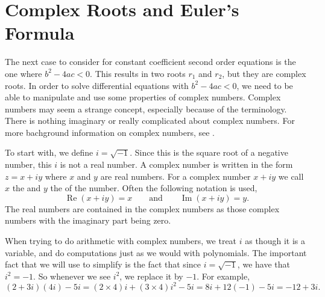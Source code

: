 \section{Complex Roots and Euler's Formula}
\label{complexroots:section}




The next case to consider for constant coefficient second order equations is the one where $b^2 - 4ac < 0$. This results in two roots $r_1$ and $r_2$, but they are complex roots. In order to solve differential equations with $b^2 - 4ac < 0$, we need to be able to manipulate and use some properties of complex numbers. Complex numbers may seem a strange concept, especially because of the
terminology.  There is nothing imaginary or really complicated about complex
numbers. For more bachground information on complex numbers, see .

To start with, we define $i = \sqrt{-1}$. Since this is the square root of a negative number, this $i$ is not a real number. A complex number is written in the form $z = x+iy$ where $x$ and $y$ are real numbers. For a complex number $x+iy$ we call
$x$ the \emph{} and $y$ the \emph{} of the number.
Often the following notation is used,
\begin{equation*}
\operatorname{Re}(x+iy) = x
\qquad \text{and} \qquad
\operatorname{Im}(x+iy) = y.
\end{equation*}
The real numbers are contained in the complex numbers as those complex numbers with the imaginary part being zero. 

When trying to do arithmetic with complex numbers, we treat $i$ as though it is a variable, and do computations just as we would
with polynomials.
The important fact that we will use to simplify is the fact that since $i = \sqrt{-1}$, we have that $i^2 = -1$.
So whenever we see $i^2$, we replace it by $-1$.
For example,
\begin{equation*}
(2+3i)(4i) - 5i = 
(2\times 4)i + (3 \times 4) i^2 - 5i
=
8i + 12 (-1) - 5i
=
-12 + 3i .
\end{equation*}

